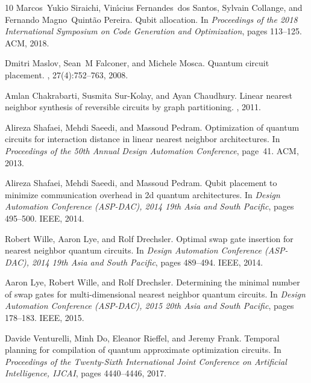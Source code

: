 \documentclass[journal,10pt,twocolumn]{IEEEtran}
\begin{document}
\begin{thebibliography}{10}
Marcos~Yukio Siraichi, Vin{\'\i}cius Fernandes~dos Santos, Sylvain Collange,
  and Fernando Magno~Quint{\~a}o Pereira.
\newblock Qubit allocation.
\newblock In {\em Proceedings of the 2018 International Symposium on Code
  Generation and Optimization}, pages 113--125. ACM, 2018.

Dmitri Maslov, Sean~M Falconer, and Michele Mosca.
\newblock Quantum circuit placement.
, 27(4):752--763, 2008.

Amlan Chakrabarti, Susmita Sur-Kolay, and Ayan Chaudhury.
\newblock Linear nearest neighbor synthesis of reversible circuits by graph
  partitioning.
, 2011.

Alireza Shafaei, Mehdi Saeedi, and Massoud Pedram.
\newblock Optimization of quantum circuits for interaction distance in linear
  nearest neighbor architectures.
\newblock In {\em Proceedings of the 50th Annual Design Automation Conference},
  page~41. ACM, 2013.

Alireza Shafaei, Mehdi Saeedi, and Massoud Pedram.
\newblock Qubit placement to minimize communication overhead in 2d quantum
  architectures.
\newblock In {\em Design Automation Conference (ASP-DAC), 2014 19th Asia and
  South Pacific}, pages 495--500. IEEE, 2014.

Robert Wille, Aaron Lye, and Rolf Drechsler.
\newblock Optimal swap gate insertion for nearest neighbor quantum circuits.
\newblock In {\em Design Automation Conference (ASP-DAC), 2014 19th Asia and
  South Pacific}, pages 489--494. IEEE, 2014.

Aaron Lye, Robert Wille, and Rolf Drechsler.
\newblock Determining the minimal number of swap gates for multi-dimensional
  nearest neighbor quantum circuits.
\newblock In {\em Design Automation Conference (ASP-DAC), 2015 20th Asia and
  South Pacific}, pages 178--183. IEEE, 2015.

Davide Venturelli, Minh Do, Eleanor Rieffel, and Jeremy Frank.
\newblock Temporal planning for compilation of quantum approximate optimization
  circuits.
\newblock In {\em Proceedings of the Twenty-Sixth International Joint
  Conference on Artificial Intelligence, IJCAI}, pages 4440--4446, 2017.


\end{thebibliography}
\end{document}
